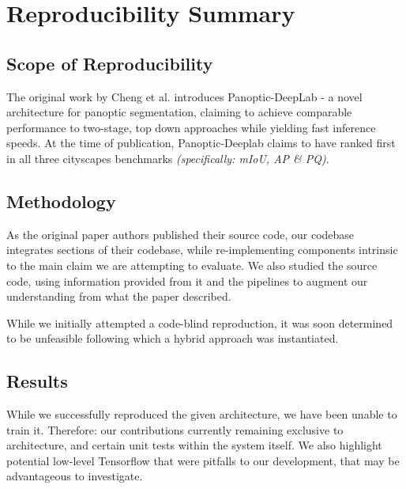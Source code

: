 \section*{\centering Reproducibility Summary}
\subsection*{Scope of Reproducibility}

The original work by Cheng et al. \cite{Cheng2020PanopticDeepLabAS} introduces Panoptic-DeepLab - a novel architecture for panoptic segmentation, claiming to achieve comparable performance to two-stage, top down approaches while yielding fast inference speeds. At the time of publication, Panoptic-Deeplab claims to have ranked first in all three cityscapes benchmarks \textit{(specifically: mIoU, AP \& PQ)}.

\subsection*{Methodology}

As the original paper authors published their source code, our codebase integrates sections of their codebase, while re-implementing components intrinsic to the main claim we are attempting to evaluate. We also studied the source code, using information provided from it and the pipelines to augment our understanding from what the paper described.

While we initially attempted a code-blind reproduction, it was soon determined to be unfeasible following which a hybrid approach was instantiated.


\subsection*{Results}


While we successfully reproduced the given architecture, we have been unable to train it. Therefore: our contributions currently remaining exclusive to architecture, and certain unit tests within the system itself. We also highlight potential low-level Tensorflow that were pitfalls to our development, that may be advantageous to investigate.

